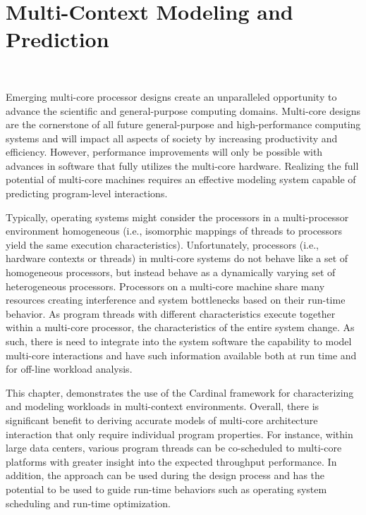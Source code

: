 \chapter{Multi-Context Modeling and Prediction}~\label{chap:simmc}

Emerging multi-core processor designs create an unparalleled
opportunity to advance the scientific and general-purpose computing
domains.  Multi-core designs are the cornerstone of all future
general-purpose and high-performance computing systems and will
impact all aspects of society by increasing productivity and
efficiency. However, performance improvements will only be possible
with advances in software that fully utilizes the multi-core hardware.
Realizing the full potential of multi-core machines requires an
effective modeling system capable of predicting program-level
interactions.

Typically, operating systems might consider the processors in a
multi-processor environment homogeneous (i.e., isomorphic mappings of
threads to processors yield the same execution characteristics).
Unfortunately, processors (i.e., hardware contexts or threads) in
multi-core systems do not behave like a set of homogeneous processors,
but instead behave as a dynamically varying set of heterogeneous
processors.  Processors on a multi-core machine share many resources
creating interference and system bottlenecks based on their run-time
behavior.  As program threads with different characteristics
execute together within a multi-core processor, the characteristics of
the entire system change.  As such, there is need to integrate into
the system software the capability to model multi-core interactions
and have such information available both at run time and for off-line
workload analysis.

This chapter, demonstrates the use of the Cardinal
framework for characterizing and modeling workloads in multi-context
environments. Overall, there is significant benefit
to deriving accurate models of multi-core architecture interaction
that only require individual program properties.  For instance,
within large data centers, various program threads can be
co-scheduled to multi-core platforms with greater insight into the
expected throughput performance. In addition, the approach can be used
during the design process and has the potential to be used to guide
run-time behaviors such as operating system scheduling and run-time
optimization.

